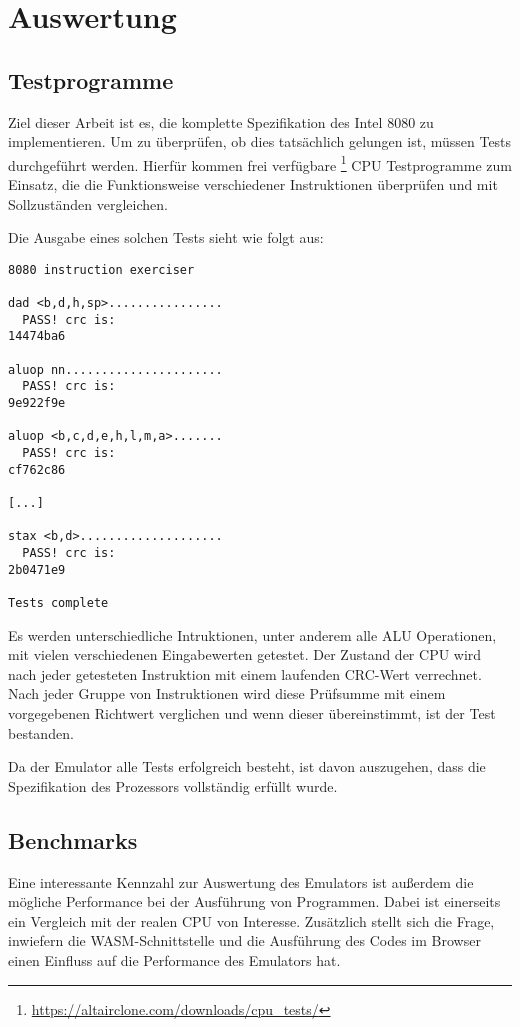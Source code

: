 \chapter{Auswertung}\label{chap:eval}

\section{Testprogramme}\label{sec:tests}

Ziel dieser Arbeit ist es, die komplette Spezifikation des Intel 8080 zu implementieren. Um zu überprüfen, ob dies tatsächlich gelungen ist, müssen Tests durchgeführt werden. Hierfür kommen frei verfügbare \footnote[1]{\url{https://altairclone.com/downloads/cpu_tests/}} CPU Testprogramme zum Einsatz, die die Funktionsweise verschiedener Instruktionen überprüfen und mit Sollzuständen vergleichen.

Die Ausgabe eines solchen Tests sieht wie folgt aus:

\begin{verbatim}
8080 instruction exerciser

dad <b,d,h,sp>................
  PASS! crc is:
14474ba6

aluop nn......................
  PASS! crc is:
9e922f9e

aluop <b,c,d,e,h,l,m,a>.......
  PASS! crc is:
cf762c86

[...]

stax <b,d>....................
  PASS! crc is:
2b0471e9

Tests complete
\end{verbatim}

Es werden unterschiedliche Intruktionen, unter anderem alle \ac{ALU} Operationen, mit vielen verschiedenen Eingabewerten getestet. Der Zustand der \ac{CPU} wird nach jeder getesteten Instruktion mit einem laufenden \ac{CRC}-Wert verrechnet. Nach jeder Gruppe von Instruktionen wird diese Prüfsumme mit einem vorgegebenen Richtwert verglichen und wenn dieser übereinstimmt, ist der Test bestanden.

Da der Emulator alle Tests erfolgreich besteht, ist davon auszugehen, dass die Spezifikation des Prozessors vollständig erfüllt wurde.

\section{Benchmarks}

Eine interessante Kennzahl zur Auswertung des Emulators ist außerdem die mögliche Performance bei der Ausführung von Programmen. Dabei ist einerseits ein Vergleich mit der realen \ac{CPU} von Interesse. Zusätzlich stellt sich die Frage, inwiefern die \ac{WASM}-Schnittstelle und die Ausführung des Codes im Browser einen Einfluss auf die Performance des Emulators hat.

